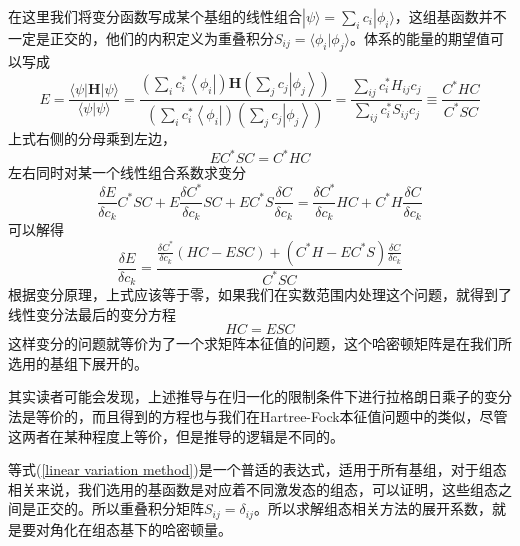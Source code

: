 \documentclass[12pt,a4paper,openany,twoside]{book}
\numberwithin{equation}{section}
\begin{document}
          在这里我们将变分函数写成某个基组的线性组合$|\psi\rangle=\sum_{i} c_{i}|\phi_{i}\rangle$，这组基函数并不一定是正交的，他们的内积定义为重叠积分$S_{ij} = \langle \phi_i | \phi_j \rangle $。体系的能量的期望值可以写成
          \begin{equation}
            E=\frac{\langle\psi|\mathbf{H}| \psi\rangle}{\langle\psi | \psi\rangle}=\frac{(\sum_{i} c_{i}^{*}\left\langle\phi_{i}\right|) \mathbf{H}(\sum_{j} c_{j}\left|\phi_{j}\right\rangle)}{(\sum_{i} c_{i}^{*}\left\langle\phi_{i}\right|)(\sum_{j} c_{j}\left|\phi_{j}\right\rangle)}=\frac{\sum_{i j} c_{i}^{*} H_{i j} c_{j}}{\sum_{i j} c_{i}^{*} S_{i j} c_{j}} \equiv \frac{C^{*} H C}{C^{*} S C}
          \end{equation}
          上式右侧的分母乘到左边，
          \begin{equation}
            E C^{*} S C=C^{*} H C
          \end{equation}
          左右同时对某一个线性组合系数求变分
          \begin{equation}
            \frac{\delta E}{\delta c_{k}} C^{*} S C+E \frac{\delta C^{*}}{\delta c_{k}} S C+E C^{*} S \frac{\delta C}{\delta c_{k}}=\frac{\delta C^{*}}{\delta c_{k}} H C+C^{*} H \frac{\delta C}{\delta c_{k}}
          \end{equation}
          可以解得
          \begin{equation}
            \frac{\delta E}{\delta c_{k}}=\frac{\frac{\delta C^{*}}{\delta c_{k}}(H C-E S C)+\left(C^{*} H-E C^{*} S\right) \frac{\delta C}{\delta c_{k}}}{C^{*} S C}
          \end{equation}
          根据变分原理，上式应该等于零，如果我们在实数范围内处理这个问题，就得到了线性变分法最后的变分方程
          \begin{equation}
            HC = ESC
            \label{linear variation method}
          \end{equation}
          这样变分的问题就等价为了一个求矩阵本征值的问题，这个哈密顿矩阵是在我们所选用的基组下展开的。
          
          其实读者可能会发现，上述推导与在归一化的限制条件下进行拉格朗日乘子的变分法是等价的，而且得到的方程也与我们在Hartree-Fock本征值问题中的类似，尽管这两者在某种程度上等价，但是推导的逻辑是不同的。

          等式(\ref{linear variation method})是一个普适的表达式，适用于所有基组，对于组态相关来说，我们选用的基函数是对应着不同激发态的组态，可以证明，这些组态之间是正交的。所以重叠积分矩阵$S_{ij} = \delta_{ij}$。所以求解组态相关方法的展开系数，就是要对角化在组态基下的哈密顿量。
\end{document}
